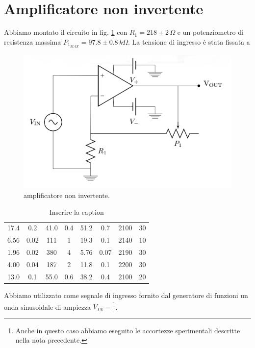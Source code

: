 \documentclass[10pt,a4paper]{article}
\begin{document}
\section{Amplificatore non invertente}
Abbiamo montato il circuito in fig. \ref{opampnoninvert} con $R_1=218 \pm 2 \,  \Omega$ e  un potenziometro di resistenza massima $P_{1_{MAX}}= 97.8 \pm 0.8 \, k\Omega$. La tensione di ingresso è stata fissata a 

\begin{figure}[!htb]
  \centering
  \includegraphics[scale=0.5]{opampnoninvert.png}
\caption{amplificatore non invertente.}
\label{opampnoninvert}
\end{figure}

\begin{table}[!htb]\centering
\begin{tabular}{|c|c|c|c|c|c|c|c|}
\hline
\hline
17.4 & 0.2 & 41.0 & 0.4 & 51.2 & 0.7 & 2100 & 30\\
6.56 & 0.02 & 111 & 1 & 19.3 & 0.1 & 2140 & 10\\
1.96 & 0.02 & 380 & 4 & 5.76 & 0.07 & 2190 & 30\\
4.00 & 0.04 & 187 & 2 & 11.8 & 0.1 & 2200 & 30\\
13.0 & 0.1 & 55.0 & 0.6 & 38.2 & 0.4 & 2100 & 20\\
\hline
\end{tabular}
\caption{Inserire la caption}
\label{Inserire la label}
\end{table}

Abbiamo utilizzato come segnale di ingresso fornito dal generatore di funzioni  un onda sinusoidale di ampiezza $V_{IN}=$\footnote{Anche in questo caso abbiamo eseguito le accortezze sperimentali descritte nella nota precedente.}.\\
\end{document}
